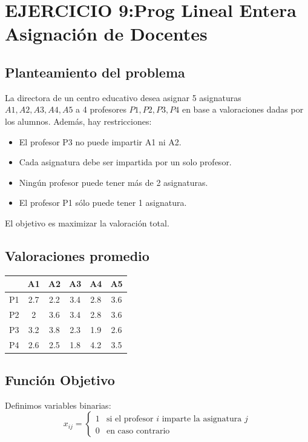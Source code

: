 \documentclass[12pt, a4paper, oneside]{book}
\theoremstyle{definition}
\begin{document}
    \newpage
    \section{EJERCICIO 9:Prog Lineal Entera Asignación de Docentes}

    \subsection{Planteamiento del problema}

    La directora de un centro educativo desea asignar 5 asignaturas \( A1, A2, A3, A4, A5 \) a 4 profesores \( P1, P2, P3, P4 \) en base a valoraciones dadas por los alumnos. Además, hay restricciones:
    \begin{itemize}
        \item El profesor P3 no puede impartir A1 ni A2.
        \item Cada asignatura debe ser impartida por un solo profesor.
        \item Ningún profesor puede tener más de 2 asignaturas.
        \item El profesor P1 sólo puede tener 1 asignatura.
    \end{itemize}
    El objetivo es maximizar la valoración total.

    \subsection{Valoraciones promedio}

    \begin{center}
    \begin{tabular}{cccccc}
    \toprule
    & A1 & A2 & A3 & A4 & A5 \\
    \midrule
    P1 & 2.7 & 2.2 & 3.4 & 2.8 & 3.6 \\
    P2 & 2 & 3.6 & 3.4 & 2.8 & 3.6 \\
    P3 & 3.2  & 3.8  & 2.3 & 1.9 & 2.6 \\
    P4 & 2.6 & 2.5 & 1.8 & 4.2 & 3.5 \\
    \bottomrule
    \end{tabular}
    \end{center}

    \subsection{Función Objetivo}

    Definimos variables binarias:
    \[
    x_{ij} =
    \begin{cases}
    1 & \text{si el profesor } i \text{ imparte la asignatura } j \\
    0 & \text{en caso contrario}
    \end{cases}
    \]
\end{document}
